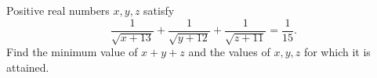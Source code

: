 Positive real numbers $x,y,z$ satisfy
\[\dfrac{1}{\sqrt{x+13}}+\dfrac{1}{\sqrt{y+12}}+\dfrac{1}{\sqrt{z+11}}=\dfrac{1}{15}.\]
Find the minimum value of $x+y+z$ and the values of $x,y,z$ for which it is attained.

